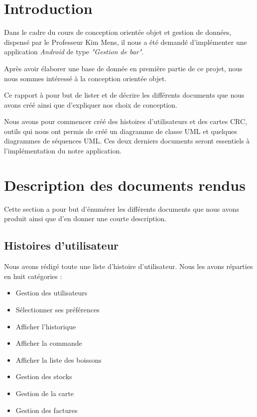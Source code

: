 \documentclass[11pt, a4, oneside, headings=normal]{scrreprt}
\begin{document}


\section*{Introduction}

Dans le cadre du cours de conception orientée objet et gestion de données, dispensé par le Professeur Kim Mens, il nous a été demandé d'implémenter une application \textit{Android} de type \textit{"Gestion de bar"}. 

Après avoir élaborer une base de donnée en première partie de ce projet, nous nous sommes intéressé à la conception orientée objet.

Ce rapport à pour but de lister et de décrire les différents documents que nous avons créé ainsi que d'expliquer nos choix de conception.

Nous avons pour commencer créé des histoires d'utilisateurs et des cartes CRC, outils qui nous ont permis de créé un diagramme de classe UML et quelques diagrammes de séquences UML. Ces deux derniers documents seront essentiels à l'implémentation du notre application.

\section*{Description des documents rendus}

Cette section a pour but d'énumérer les différents documents que nous avons produit ainsi que d'en donner une courte description.

\subsection*{Histoires d'utilisateur}

Nous avons rédigé toute une liste d'histoire d'utilisateur. Nous les avons réparties en huit catégories :
\begin{itemize}
\item Gestion des utilisateurs
\item Sélectionner ses préférences
\item Afficher l'historique
\item Afficher la commande
\item Afficher la liste des boissons
\item Gestion des stocks
\item Gestion de la carte
\item Gestion des factures
\end{itemize}
\end{document}
